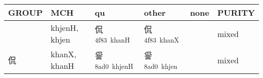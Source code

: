 \documentclass[14pt,a4paper]{scrartcl}
\begin{document}
\begin{longtable}[c]{@{}llllll@{}}
\toprule
\begin{minipage}[b]{0.14\columnwidth}\raggedright\strut
GROUP
\strut\end{minipage} &
\begin{minipage}[b]{0.14\columnwidth}\raggedright\strut
MCH
\strut\end{minipage} &
\begin{minipage}[b]{0.14\columnwidth}\raggedright\strut
qu
\strut\end{minipage} &
\begin{minipage}[b]{0.14\columnwidth}\raggedright\strut
other
\strut\end{minipage} &
\begin{minipage}[b]{0.14\columnwidth}\raggedright\strut
none
\strut\end{minipage} &
\begin{minipage}[b]{0.14\columnwidth}\raggedright\strut
PURITY
\strut\end{minipage}\tabularnewline
\midrule
\endhead
\begin{minipage}[t]{0.14\columnwidth}\raggedright\strut
𠈉
\strut\end{minipage} &
\begin{minipage}[t]{0.14\columnwidth}\raggedright\strut
khjenH, khjen
\strut\end{minipage} &
\begin{minipage}[t]{0.14\columnwidth}\raggedright\strut
侃\textsuperscript{4f83~khanH}
\strut\end{minipage} &
\begin{minipage}[t]{0.14\columnwidth}\raggedright\strut
侃\textsuperscript{4f83~khanX}
\strut\end{minipage} &
\begin{minipage}[t]{0.14\columnwidth}\raggedright\strut
\strut\end{minipage} &
\begin{minipage}[t]{0.14\columnwidth}\raggedright\strut
mixed
\strut\end{minipage}\tabularnewline
\begin{minipage}[t]{0.14\columnwidth}\raggedright\strut
侃
\strut\end{minipage} &
\begin{minipage}[t]{0.14\columnwidth}\raggedright\strut
khanX, khanH
\strut\end{minipage} &
\begin{minipage}[t]{0.14\columnwidth}\raggedright\strut
諐\textsuperscript{8ad0~khjenH}
\strut\end{minipage} &
\begin{minipage}[t]{0.14\columnwidth}\raggedright\strut
諐\textsuperscript{8ad0~khjen}
\strut\end{minipage} &
\begin{minipage}[t]{0.14\columnwidth}\raggedright\strut
\strut\end{minipage} &
\begin{minipage}[t]{0.14\columnwidth}\raggedright\strut
mixed
\strut\end{minipage}\tabularnewline
\bottomrule
\end{longtable}
\end{document}
